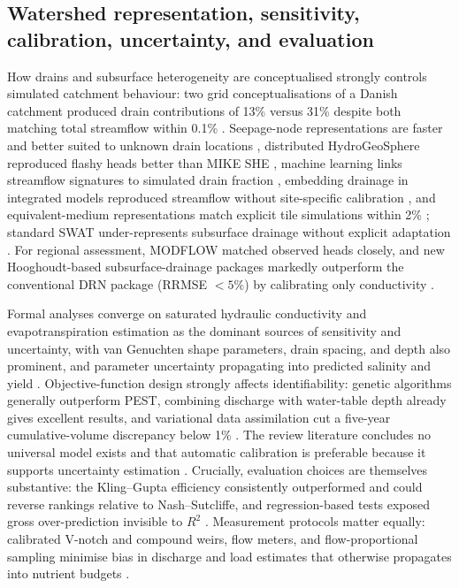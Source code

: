 \subsection{Watershed representation, sensitivity, calibration, uncertainty, and evaluation}

How drains and subsurface heterogeneity are conceptualised strongly controls
simulated catchment behaviour: two grid conceptualisations of a Danish
catchment produced drain contributions of 13\% versus 31\% despite both
matching total streamflow within 0.1\% \parencite{Karan2021}. Seepage-node
representations are faster and better suited to unknown drain locations
\parencite{Boico2022}, distributed HydroGeoSphere reproduced flashy heads
better than MIKE SHE \parencite{DeSchepper2017}, machine learning links
streamflow signatures to simulated drain fraction \parencite{Schneider2022},
embedding drainage in integrated models reproduced streamflow without
site-specific calibration \parencite{Rathore2024,Muma2016}, and equivalent-medium
representations match explicit tile simulations within 2\%
\parencite{Thomas2016}; standard SWAT under-represents subsurface drainage
without explicit adaptation \parencite{Manguerra1998,Golmohammadi2016,Rahman2014}.
For regional assessment, MODFLOW matched observed heads closely, and new
Hooghoudt-based subsurface-drainage packages markedly outperform the
conventional DRN package (RRMSE $<5\%$) by calibrating only conductivity
\parencite{Mirlas2012,Ghorbani2016,Yang2022b,Han2025,Qian2025b}.

Formal analyses converge on saturated hydraulic conductivity and
evapotranspiration estimation as the dominant sources of sensitivity and
uncertainty, with van Genuchten shape parameters, drain spacing, and depth
also prominent, and parameter uncertainty propagating into predicted salinity
and yield
\parencite{NabiSichani2012,Malakshahi2020,Wang2006,Sedaghatdoost2018,Timalsina2023,Alzraiee2013}.
Objective-function design strongly affects identifiability: genetic algorithms
generally outperform PEST, combining discharge with water-table depth already
gives excellent results, and variational data assimilation cut a five-year
cumulative-volume discrepancy below 1\%
\parencite{Sedaghatdoost2019,Chelil2022b,Schoups2005}. The review literature
concludes no universal model exists and that automatic calibration is
preferable because it supports uncertainty estimation \parencite{Singh2019b}.
Crucially, evaluation choices are themselves substantive: the Kling--Gupta
efficiency consistently outperformed and could reverse rankings relative to
Nash--Sutcliffe, and regression-based tests exposed gross over-prediction
invisible to $R^2$
\parencite{Bruhn2025,STONE1995,SAVABI1995,Wessel2022}. Measurement protocols
matter equally: calibrated V-notch and compound weirs, flow meters, and
flow-proportional sampling minimise bias in discharge and load estimates that
otherwise propagates into nutrient budgets
\parencite{Christianson2019,BinShokrana2021,Napierala2023,Katuwal2024,Enamorado2007,Dialameh2022,Young2023}.

